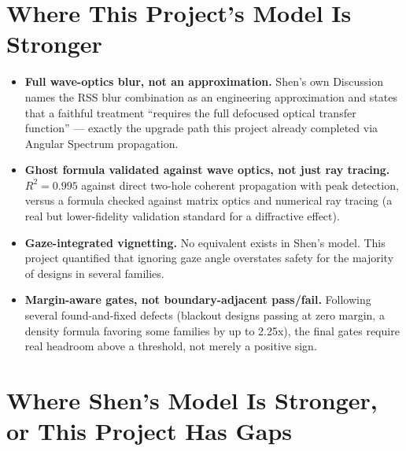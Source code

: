 \section{Where This Project's Model Is Stronger}

\begin{itemize}
  \item \textbf{Full wave-optics blur, not an approximation.} Shen's own
  Discussion names the RSS blur combination as an engineering
  approximation and states that a faithful treatment ``requires the full
  defocused optical transfer function'' --- exactly the upgrade path this
  project already completed via Angular Spectrum propagation.
  \item \textbf{Ghost formula validated against wave optics, not just ray
  tracing.} $R^2=0.995$ against direct two-hole coherent propagation with
  peak detection, versus a formula checked against matrix optics and
  numerical ray tracing (a real but lower-fidelity validation standard for
  a diffractive effect).
  \item \textbf{Gaze-integrated vignetting.} No equivalent exists in
  Shen's model. This project quantified that ignoring gaze angle
  overstates safety for the majority of designs in several families.
  \item \textbf{Margin-aware gates, not boundary-adjacent pass/fail.}
  Following several found-and-fixed defects (blackout designs passing at
  zero margin, a density formula favoring some families by up to 2.25x),
  the final gates require real headroom above a threshold, not merely a
  positive sign.
\end{itemize}

\section{Where Shen's Model Is Stronger, or This Project Has Gaps}

